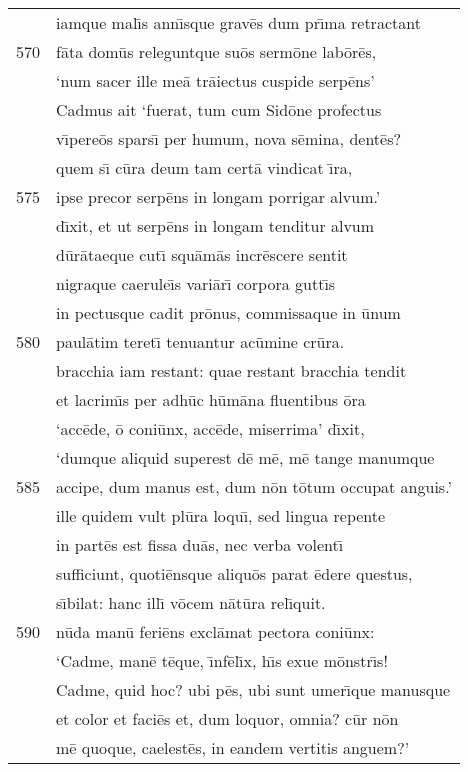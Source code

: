 \documentclass[paper=6in:9in,pagesize=pdftex,
               headinclude=on,footinclude=on,12pt]{scrbook}
\begin{document}
\begin{longtable}[p]{ r l }
 & iamque mal\={\i}s ann\={\i}sque grav\=es dum pr\={\i}ma retractant\\ 
570 & f\=ata dom\=us releguntque su\=os serm\=one lab\=or\=es,\\ 
 & `num sacer ille me\=a tr\=aiectus cuspide serp\=ens'\\ 
 & Cadmus ait `fuerat, tum cum Sid\=one profectus\\ 
 & v\={\i}pere\=os spars\={\i} per humum, nova s\=emina, dent\=es?\\ 
 & quem s\={\i} c\=ura deum tam cert\=a vindicat \={\i}ra,\\ 
575 & ipse precor serp\=ens in longam porrigar alvum.'\\ 
 & d\={\i}xit, et ut serp\=ens in longam tenditur alvum\\ 
 & d\=ur\=ataeque cut\={\i} squ\=am\=as incr\=escere sentit\\ 
 & nigraque caerule\={\i}s vari\=ar\={\i} corpora gutt\={\i}s\\ 
 & in pectusque cadit pr\=onus, commissaque in \=unum\\ 
580 & paul\=atim teret\={\i} tenuantur ac\=umine cr\=ura.\\ 
 & bracchia iam restant: quae restant bracchia tendit\\ 
 & et lacrim\={\i}s per adh\=uc h\=um\=ana fluentibus \=ora\\ 
 & `acc\=ede, \=o coni\=unx, acc\=ede, miserrima' d\={\i}xit,\\ 
 & `dumque aliquid superest d\=e m\=e, m\=e tange manumque\\ 
585 & accipe, dum manus est, dum n\=on t\=otum occupat anguis.'\\ 
 & ille quidem vult pl\=ura loqu\={\i}, sed lingua repente\\ 
 & in part\=es est fissa du\=as, nec verba volent\={\i}\\ 
 & sufficiunt, quoti\=ensque aliqu\=os parat \=edere questus,\\ 
 & s\={\i}bilat: hanc ill\={\i} v\=ocem n\=at\=ura rel\={\i}quit.\\ 
590 & n\=uda man\=u feri\=ens excl\=amat pectora coni\=unx:\\ 
 & `Cadme, man\=e t\=eque, \={\i}nf\=el\={\i}x, h\={\i}s exue m\=onstr\={\i}s!\\ 
 & Cadme, quid hoc? ubi p\=es, ubi sunt umer\={\i}que manusque\\ 
 & et color et faci\=es et, dum loquor, omnia? c\=ur n\=on\\ 
 & m\=e quoque, caelest\=es, in eandem vertitis anguem?'\\ 

\end{longtable}
\end{document}
